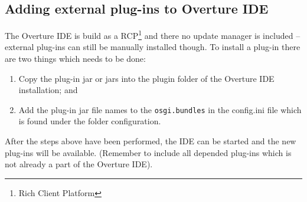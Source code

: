 \documentclass{overturerepchap}
\begin{document}
\subsection{Adding external plug-ins to Overture IDE}

The Overture IDE is build as a RCP\footnote{Rich Client Platform} and
there no update manager is included -- external plug-ins can
still be manually installed though. To install a plug-in there are two
things which needs to be done:
\begin{enumerate}
\item Copy the plug-in jar or jars into the plugin folder of the Overture IDE installation; and
\item Add the plug-in jar file names to the \texttt{osgi.bundles} in the config.ini file which is found under the folder configuration.
\end{enumerate}

After the steps above have been performed, the IDE can be started and the new plug-ins will be available. (Remember to include all depended plug-ins which is not already a part of the Overture IDE).
\end{document}
